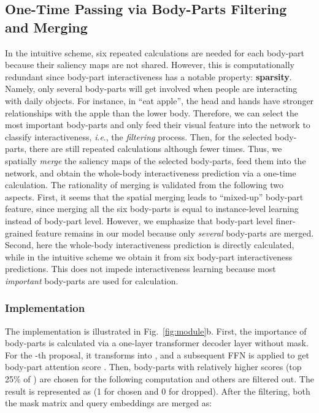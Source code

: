 \documentclass[runningheads]{llncs}
\newcommand{\ie}{\textit{i}.\textit{e}.}
\begin{document}
\subsection{One-Time Passing via Body-Parts Filtering and Merging} 
\label{sec:filter&merge}
In the intuitive scheme, six repeated calculations are needed for each body-part because their saliency maps are not shared. However, this is computationally redundant since body-part interactiveness has a notable property: \textbf{sparsity}. Namely, only several body-parts will get involved when people are interacting with daily objects. For instance, in ``eat apple'', the head and hands have stronger relationships with the apple than the lower body.
Therefore, we can select the most important body-parts and only feed their visual feature into the network to classify interactiveness, \ie, the \textit{filtering} process. 
Then, for the selected body-parts, there are still repeated calculations although fewer times. Thus, we spatially \textit{merge} the saliency maps of the selected body-parts, feed them into the network, and obtain the whole-body interactiveness prediction via a one-time calculation. The rationality of merging is validated from the following two aspects. First, it seems that the spatial merging leads to ``mixed-up'' body-part feature, since merging all the six body-parts is equal to instance-level learning instead of body-part level. However, we emphasize that body-part level finer-grained feature remains in our model because only \textit{several} body-parts are merged. Second, here the whole-body interactiveness prediction is directly calculated, while in the intuitive scheme we obtain it from six body-part interactiveness predictions. This does not impede interactiveness learning because most \textit{important} body-parts are used for calculation.

\subsubsection{Implementation} 
The implementation is illustrated in Fig.~\ref{fig:module}b. 
First, the importance of body-parts is calculated via a one-layer transformer decoder layer  without mask. 
For the -th proposal, it transforms  into , and a subsequent FFN is applied to get body-part attention score . Then, body-parts with relatively higher scores (top 25\% of ) are chosen for the following computation and others are filtered out. The result is represented as  (1 for chosen and 0 for dropped).
After the filtering, 
both the mask matrix and query embeddings are merged as:
\end{document}
